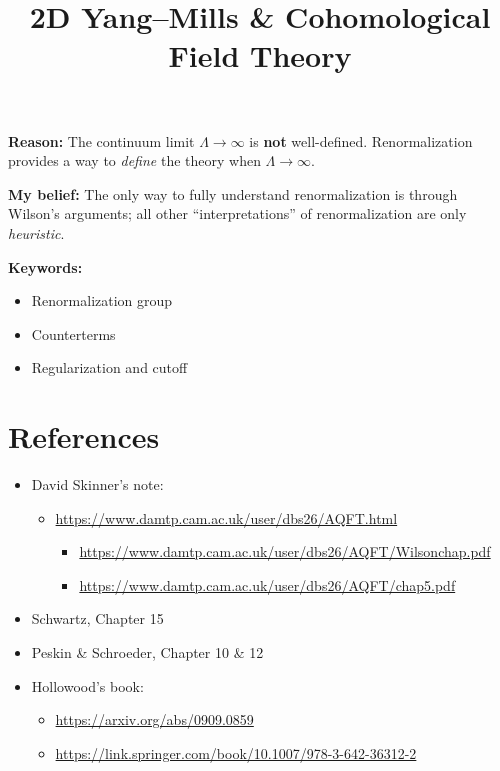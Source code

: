 \documentclass[a4paper
	,10pt
]{article}
\title{2D Yang--Mills \& Cohomological Field Theory}
\begin{document}
\maketitle
{}
\thispagestyle{empty}

\vspace*{-.5\baselineskip}
	\textbf{Reason:} The continuum limit $\Lambda\to\infty$ is \textbf{not} well-defined.
	Renormalization provides a way to \emph{define} the theory when
	$\Lambda\to\infty$.
	
	\textbf{My belief:} The only way to fully understand renormalization is
	through Wilson's arguments; all other ``interpretations'' of
	renormalization are only \emph{heuristic}.

	\textbf{Keywords:}
	\begin{itemize}[nosep,topsep=-.5\parskip]
	\item Renormalization group
	\item Counterterms
	\item Regularization and cutoff
	\end{itemize}


\setlength{\parskip}{.1\baselineskip}
\tableofcontents
\setlength{\parskip}{\parskipnorm}

\addtocounter{section}{-1}
\section{References}


	\begin{itemize}[parsep=0pt,itemsep=.5\parskip,labelindent=.1\parindent]
	\item David Skinner's note:
	  \begin{itemize}[nosep]
	  \item \url{https://www.damtp.cam.ac.uk/user/dbs26/AQFT.html}
	    \begin{itemize}[nosep]
	    \item \url{https://www.damtp.cam.ac.uk/user/dbs26/AQFT/Wilsonchap.pdf}
	    \item \url{https://www.damtp.cam.ac.uk/user/dbs26/AQFT/chap5.pdf}
	    \end{itemize}
	  \end{itemize}
	\item Schwartz, Chapter 15
	\item Peskin \& Schroeder, Chapter 10 \& 12
	\item Hollowood's book:
	  \begin{itemize}[nosep]
	  \item \url{https://arxiv.org/abs/0909.0859}
	  \item \url{https://link.springer.com/book/10.1007/978-3-642-36312-2}
	  \end{itemize}
	\end{itemize}
\end{document}
